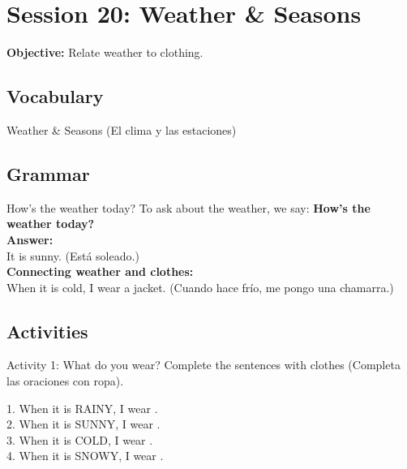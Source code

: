 \section*{Session 20: Weather \& Seasons}
\textbf{Objective:} Relate weather to clothing.

\subsection*{Vocabulary}
\begin{vocabcard}{Weather \& Seasons (El clima y las estaciones)}
\end{vocabcard}

\subsection*{Grammar}
\begin{grammartip}{How's the weather today?}
  To ask about the weather, we say: \textbf{How's the weather today?}\\
  \textbf{Answer:}\\
  It is sunny. (Está soleado.)\\
  \textbf{Connecting weather and clothes:}\\
  When it is cold, I wear a jacket. (Cuando hace frío, me pongo una chamarra.)
\end{grammartip}

\subsection*{Activities}

\begin{activity}{Activity 1: What do you wear?}
  Complete the sentences with clothes (Completa las oraciones con ropa).
  
  1. When it is RAINY, I wear \answerline[4cm].\\
  2. When it is SUNNY, I wear \answerline[4cm].\\
  3. When it is COLD, I wear \answerline[4cm].\\
  4. When it is SNOWY, I wear \answerline[4cm].
\end{activity}

